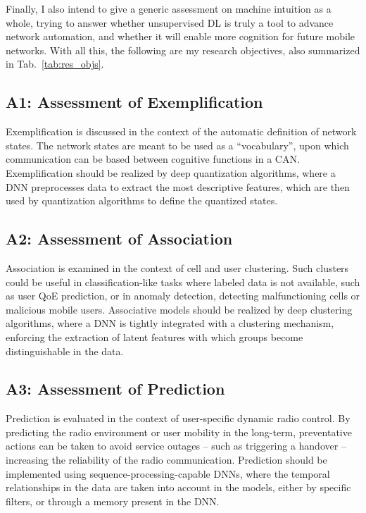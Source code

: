 			Finally, I also intend to give a generic assessment on machine intuition as a whole, trying to answer whether unsupervised \ac{DL} is truly a tool to advance network automation, and whether it will enable more cognition for future mobile networks.
			With all this, the following are my research objectives, also summarized in Tab.~\ref{tab:res_objs}.
			
			\subsection*{A1: Assessment of Exemplification}
			
				Exemplification is discussed in the context of the automatic definition of network states.
				The network states are meant to be used as a ``vocabulary'', upon which communication can be based between cognitive functions in a \ac{CAN}.
				Exemplification should be realized by deep quantization algorithms, where a \ac{DNN} preprocesses data to extract the most descriptive features, which are then used by quantization algorithms to define the quantized states.
							
			\subsection*{A2: Assessment of Association}

				Association is examined in the context of cell and user clustering.
				Such clusters could be useful in classification-like tasks where labeled data is not available, such as user \ac{QoE} prediction, or in anomaly detection, detecting malfunctioning cells or malicious mobile users.
				Associative models should be realized by deep clustering algorithms, where a \ac{DNN} is tightly integrated with a clustering mechanism, enforcing the extraction of latent features with which groups become distinguishable in the data.
				
			\subsection*{A3: Assessment of Prediction}

				Prediction is evaluated in the context of user-specific dynamic radio control.
				By predicting the radio environment or user mobility in the long-term, preventative actions can be taken to avoid service outages -- such as triggering a handover -- increasing the reliability of the radio communication.
				Prediction should be implemented using sequence-processing-capable \acp{DNN}, where the temporal relationships in the data are taken into account in the models, either by specific filters, or through a memory present in the \ac{DNN}.
			
